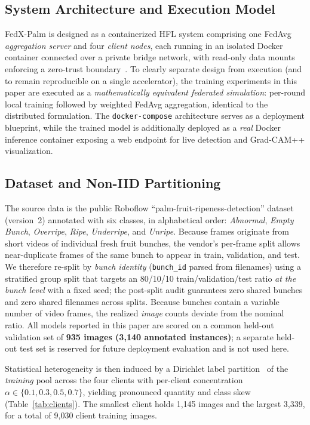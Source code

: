 \documentclass[conference]{IEEEtran}
\begin{document}
\subsection{System Architecture and Execution Model}
FedX-Palm is designed as a containerized HFL system comprising one FedAvg
\emph{aggregation server} and four \emph{client nodes}, each running in an
isolated Docker container connected over a private bridge network, with
read-only data mounts enforcing a zero-trust boundary~\cite{merkel2014docker}.
To clearly separate design from execution (and to remain reproducible on a
single accelerator), the training experiments in this paper are executed as a
\emph{mathematically equivalent federated simulation}: per-round local training
followed by weighted FedAvg aggregation, identical to the distributed
formulation. The \texttt{docker-compose} architecture serves as a deployment
blueprint, while the trained model is additionally deployed as a \emph{real}
Docker inference container exposing a web endpoint for live detection and
Grad-CAM++ visualization.

\subsection{Dataset and Non-IID Partitioning}
\label{sec:dataset}
The source data is the public Roboflow ``palm-fruit-ripeness-detection''
dataset (version~2) annotated with six classes, in alphabetical order:
\emph{Abnormal}, \emph{Empty Bunch}, \emph{Overripe}, \emph{Ripe},
\emph{Underripe}, and \emph{Unripe}. Because frames originate from short
videos of individual fresh fruit bunches, the vendor's per-frame split allows
near-duplicate frames of the same bunch to appear in train, validation, and
test. We therefore re-split by \emph{bunch identity}
(\texttt{bunch\_id} parsed from filenames) using a stratified group split that
targets an 80/10/10 train/validation/test ratio \emph{at the bunch level} with
a fixed seed; the post-split audit guarantees zero shared bunches and zero
shared filenames across splits. Because bunches contain a variable number of
video frames, the realized \emph{image} counts deviate from the nominal ratio.
All models reported in this paper are scored on a common held-out validation
set of \textbf{935 images (3{,}140 annotated instances)}; a separate held-out
test set is reserved for future deployment evaluation and is not used here.

Statistical heterogeneity is then induced by a Dirichlet label
partition~\cite{hsu2019measuring} of the \emph{training} pool across the four
clients with per-client concentration
$\alpha\in\{0.1,0.3,0.5,0.7\}$, yielding pronounced quantity and class skew
(Table~\ref{tab:clients}). The smallest client holds 1{,}145 images and the
largest 3{,}339, for a total of 9{,}030 client training images.
\end{document}
